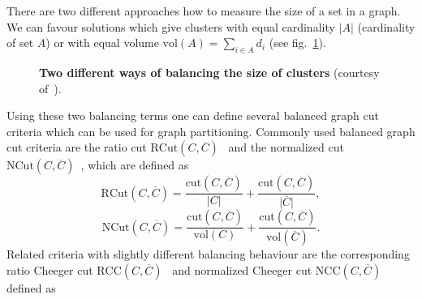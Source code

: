 There are two different approaches how to measure the size of a set in a graph. We can favour solutions which give clusters with equal cardinality $\lvert A \rvert$ 
(cardinality of set $A$) or with equal volume $\mathrm{vol}(A) = \sum_{i \in A} d_i$ (see fig.~\ref{fig:bal_cr}).
\begin{figure}[h!]
 \centering
\quad
\qquad
 \caption[Two different ways of balancing the size of clusters]{
  {\bf Two different ways of balancing the size of clusters} (courtesy of~\cite{HeinBuh09}).}
\label{fig:bal_cr}
\end{figure}
Using these two balancing terms one can define several balanced graph cut criteria which can be used for graph partitioning. Commonly used balanced graph cut criteria are the ratio cut $\mathrm{RCut}(C,\overline{C})$~\cite{HagenK91} and 
the normalized cut $\mathrm{NCut}(C,\overline{C})$~\cite{Shi00},
which are defined as
\begin{equation}
\mathrm{RCut}(C,\overline{C}) =  \frac{\mathrm{cut}(C,\overline{C})}{\lvert C \rvert} + \frac{\mathrm{cut}(C,\overline{C})}{\lvert \overline{C} \rvert},
\end{equation}
\begin{equation}
\mathrm{NCut}(C,\overline{C}) =  \frac{\mathrm{cut}(C,\overline{C})}{\mathrm{vol}(C)} + \frac{\mathrm{cut}(C,\overline{C})}{\mathrm{vol}(\overline{C})}.
\end{equation}
Related criteria with slightly different balancing behaviour are the corresponding ratio Cheeger cut $\mathrm{RCC}(C,\overline{C})$~\cite{c70} and normalized Cheeger cut $\mathrm{NCC}(C,\overline{C})$ defined as
